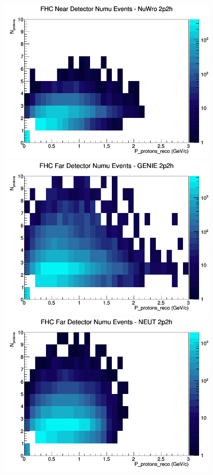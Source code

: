 \begin{figure}[h]
\includegraphics[width=\linewidth]{eff_N_P/LAr/protons/2p2h_FHC_ND_numu_N_P_NuWro.png}
\endminipage
\newline
{}
\includegraphics[width=\linewidth]{eff_N_P/LAr/protons/2p2h_FHC_FD_numu_N_P_GENIE.png}
\endminipage
{}
\includegraphics[width=\linewidth]{eff_N_P/LAr/protons/2p2h_FHC_FD_numu_N_P_NEUT.png}

\end{figure}
